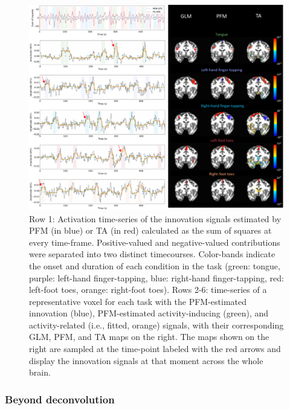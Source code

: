 \begin{figure}[t!]
    \begin{center}
        \includegraphics[width=\textwidth]{figures/task_maps.pdf}
    \end{center}
    \caption{Row 1: Activation time-series of the innovation signals estimated by PFM (in blue) or TA (in red) calculated as the sum of squares at every time-frame. Positive-valued and negative-valued contributions were separated into two distinct timecourses. Color-bands indicate the onset and duration of each condition in the task (green: tongue, purple: left-hand finger-tapping, blue: right-hand finger-tapping, red: left-foot toes, orange: right-foot toes). Rows 2-6: time-series of a representative voxel for each task with the PFM-estimated innovation (blue), PFM-estimated activity-inducing (green), and activity-related (i.e., fitted, orange) signals, with their corresponding GLM, PFM, and TA maps on the right. The maps shown on the right are sampled at the time-point labeled with the red arrows and display the innovation signals at that moment across the whole brain.}
\label{fig:task_maps}
\end{figure}

\subsubsection{Beyond deconvolution}


